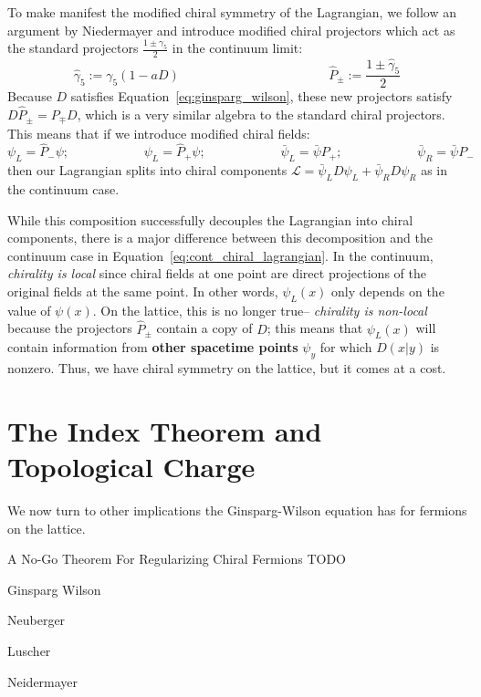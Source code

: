\documentclass[11pt, oneside]{article}   	%
\theoremstyle{definition}
\begin{document}
To make manifest the modified chiral symmetry of the Lagrangian, we follow an argument by Niedermayer \cite{niedermayer} and introduce 
modified chiral projectors which act as the standard projectors $\frac{1\pm\gamma_5}{2}$ in the continuum limit:
\begin{equation}
	\hat\gamma_5 := \gamma_5 (1 - a D)\;\;\;\;\;\;\;\;\;\;\;\;\;\;\;\;\;\;\;\;\;\;\;\;\;\;\;\;\;\;\;\;\;\;\;\;\;\;\;\;\;\; \hat P_\pm := \frac{1\pm\hat\gamma_5}{2}
\end{equation}
Because $D$ satisfies Equation~\ref{eq:ginsparg_wilson}, these new projectors satisfy $D\hat P_\pm = P_\mp D$, which is a very similar algebra to the standard 
chiral projectors. This means that if we introduce modified chiral fields:
\begin{equation}
	\psi_L = \hat P_-\psi ;\;\;\;\;\;\;\;\;\;\;\;\;\;\;\;\;\;\;\;\;\; \psi_L = \hat P_+\psi ;\;\;\;\;\;\;\;\;\;\;\;\;\;\;\;\;\;\;\;\;\; \bar\psi_L = \bar\psi P_+ ;\;\;\;\;\;\;\;\;\;\;\;\;\;\;\;\;\;\;\;\;\; \bar\psi_R = 
	\bar\psi P_-
\end{equation}
then our Lagrangian splits into chiral components $\mathcal L = \bar\psi_L D\psi_L + \bar\psi_R D\psi_R$ as in the continuum case. 

While this composition successfully decouples the Lagrangian into chiral components, there is a major difference between this decomposition 
and the continuum case in Equation~\ref{eq:cont_chiral_lagrangian}. In the continuum, \textit{chirality is local} since chiral fields at one 
point are direct projections of the original fields at the same point. In other words, $\psi_L(x)$ only depends on the value of $\psi(x)$. 
On the lattice, this is no longer true-- \textit{chirality is non-local} because the projectors $\hat P_\pm$ contain a copy of $D$; this means that 
$\psi_L(x)$ will contain information from \textbf{other spacetime points} $\psi_y$ for which $D(x | y)$ is nonzero. Thus, we have chiral symmetry 
on the lattice, but it comes at a cost. 


\section{The Index Theorem and Topological Charge}

We now turn to other implications the Ginsparg-Wilson equation has for fermions on the lattice. 


\newpage
\begin{thebibliography}{99}

	A No-Go Theorem For Regularizing Chiral Fermions TODO
	
	Ginsparg Wilson
	
	Neuberger
	
	Luscher
	
	Neidermayer

\end{thebibliography}
\end{document}
